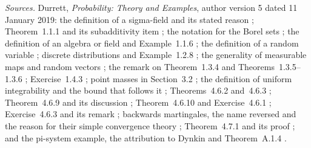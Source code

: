 \emph{Sources.} Durrett, \emph{Probability: Theory and Examples},
author version 5 dated 11 January 2019: the definition of a sigma-field
and its stated reason \cite[sec.~1.1, p.~1]{DurrettPTEAuthor2019};
Theorem~1.1.1 and its subadditivity item \cite[p.~2]{DurrettPTEAuthor2019}; the
notation for the Borel sets \cite[p.~3]{DurrettPTEAuthor2019}; the
definition of an algebra or field and Example~1.1.6
\cite[p.~4]{DurrettPTEAuthor2019}; the definition of a random variable
\cite[sec.~1.2, p.~10]{DurrettPTEAuthor2019}; discrete distributions and
Example~1.2.8 \cite[p.~13]{DurrettPTEAuthor2019}; the generality of
measurable maps and random vectors \cite[sec.~1.3, p.~15]{DurrettPTEAuthor2019};
the remark on Theorem~1.3.4 and Theorems~1.3.5--1.3.6
\cite[p.~16]{DurrettPTEAuthor2019};
Exercise~1.4.3 \cite[p.~24]{DurrettPTEAuthor2019}; point masses in
Section~3.2 \cite[p.~117]{DurrettPTEAuthor2019}; the definition of
uniform integrability and the bound that follows it
\cite[sec.~4.6, p.~244]{DurrettPTEAuthor2019}; Theorems~4.6.2
and~4.6.3 \cite[p.~245]{DurrettPTEAuthor2019}; Theorem~4.6.9 and its discussion
\cite[pp.~247--248]{DurrettPTEAuthor2019}; Theorem~4.6.10 and
Exercise~4.6.1 \cite[p.~248]{DurrettPTEAuthor2019}; Exercise~4.6.3 and
its remark \cite[p.~249]{DurrettPTEAuthor2019}; backwards martingales,
the name reversed and the reason for their simple convergence theory
\cite[sec.~4.7, p.~249]{DurrettPTEAuthor2019}; Theorem~4.7.1 and its
proof \cite[pp.~249--250]{DurrettPTEAuthor2019}; and the pi-system
example, the attribution to Dynkin and Theorem~A.1.4
\cite[app.~A.1, p.~456]{DurrettPTEAuthor2019}.
